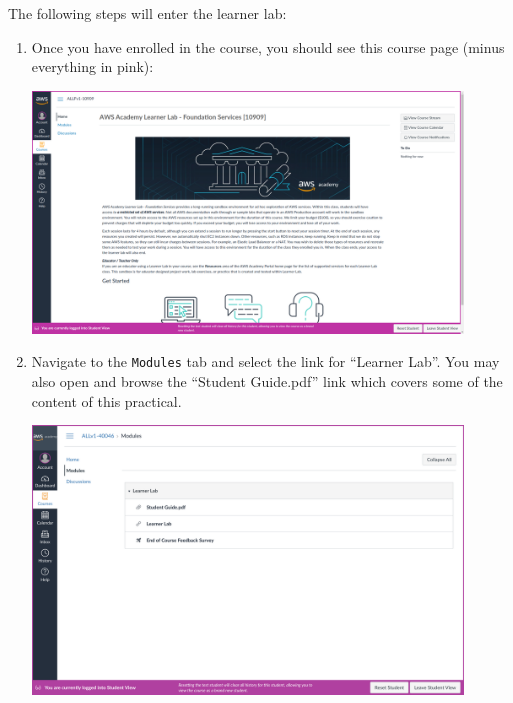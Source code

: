 \documentclass{csse4400}
\begin{document}
The following steps will enter the learner lab:

\begin{enumerate}

\item Once you have enrolled in the course, you should see this course page (minus everything in pink):

\includegraphics[width=0.9\textwidth]{images/academy-homepage}

\item Navigate to the \texttt{Modules} tab and select the link for ``Learner Lab''.
      You may also open and browse the ``Student Guide.pdf'' link which covers some of the content of this practical.

\includegraphics[width=0.9\textwidth]{images/modules-page}


\end{enumerate}
\end{document}
